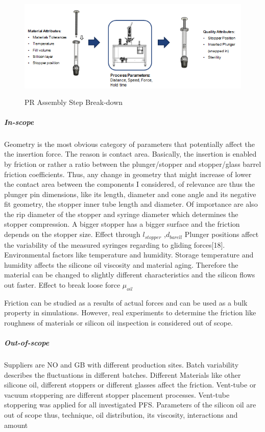 \begin{figure}[h!]	
	\centering
\includegraphics[height=5cm]{img/in_out.PNG}
   \caption{PR Assembly Step Break-down}
 \label{fgr:PFS}
\end{figure}
    
\subparagraph*{In-scope}
 
	Geometry is the most obvious category of parameters that potentially affect the the insertion force. The reason is contact area. Basically, the insertion is enabled by friction or rather a ratio between the plunger/stopper and stopper/glass barrel friction coefficients. Thus, any change in geometry that might increase of lower the contact area between the components I considered, of relevance are thus the plunger pin dimensions, like its length, diameter and cone angle and its negative fit geometry, the stopper inner tube length and diameter. Of importance are also the rip diameter of the stopper and	syringe diameter which determines the stopper compression. A bigger stopper has a bigger surface and the friction depends on the stopper size. Effect through $l_{stopper}$  ,$d_{barell}$
	 Plunger positions affect the variability of the measured syringes regarding to gliding forces[18].
	Environmental factors like temperature and humidity.
    Storage temperature and humidity affects the silicone oil viscosity and material aging. Therefore the material can be changed to slightly different characteristics and the silicon flows out faster. Effect to break loose force $\mu_{oil}$
    
    Friction can be studied as a results of actual forces and can be used as a bulk property in simulations. However, real experiments to determine the friction like roughness of materials or silicon oil inspection is considered out of scope. 
\subparagraph*{Out-of-scope}
Suppliers are NO and GB with different production sites.
Batch variability describes the fluctuations in different batches. 
	Different Materials like other silicone oil, different stoppers or different glasses affect the friction. 
	Vent-tube or vacuum stoppering are different stopper placement processes.  Vent-tube stoppering was applied for all investigated PFS. 
	Parameters of the silicon oil are out of scope thus, technique, oil distribution, its viscosity, interactions and amount
    

